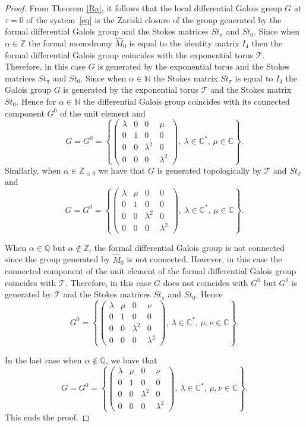 \documentclass[10pt,a4paper]{amsart}
\numberwithin{equation}{section}
\begin{document}
 \begin{proof}
 From Theorem \ref{Ra}, it follows that the local differential Galois group $G$ at $\tau=0$ of the system~\eqref{eq}
 is the Zariski closure of the group generated by the formal differential Galois group
 and the Stokes matrices $St_{\pi}$ and $St_0$. Since when $\alpha\in\mathbb{Z}$ the formal monodromy $\hat{M}_0$ is equal
 to the identity matrix $I_4$ then the formal differential Galois group coincides with the exponential torus $\mathcal{T}$.
 Therefore, in this case $G$ is generated by the exponential torus and the
 Stokes matrices $St_{\pi}$ and $St_0$. Since when $\alpha\in\mathbb{N}$ the Stokes matrix $St_{\pi}$ is equal to $I_4$ the
 Galois group $G$ is generated by the exponential torus $\mathcal{T}$ and the Stokes matrix $St_0$. Hence for $\alpha\in\mathbb{N}$
 the differential Galois group coincides with its connected component $G^0$ of the unit element and
 \[
 G=G^0=\left\{\begin{pmatrix}
 \lambda & 0 & 0 & \mu\\
 0 & 1 & 0 & 0\\
 0 & 0 & \lambda^2 & 0\\
 0 & 0 & 0 & \lambda^2
 \end{pmatrix}, \ \lambda\in\mathbb{C}^*,\, \mu\in\mathbb{C}\right\} .
 \]
Similarly, when $\alpha\in\mathbb{Z}_{\leq 0}$ we have that $G$
 is generated topologically by $\mathcal{T}$ and $St_{\pi}$ and
 \[
 G=G^0=\left\{\begin{pmatrix}
 \lambda & \mu & 0 & 0\\
 0 & 1 & 0 & 0\\
 0 & 0 & \lambda^2 & 0\\
 0 & 0 & 0 & \lambda^2
 \end{pmatrix}, \ \lambda\in\mathbb{C}^*,\, \mu\in\mathbb{C}\right\} .
 \]

 When $\alpha\in\mathbb{Q}$ but $\alpha\notin\mathbb{Z}$, the formal differential Galois group is not connected since the group generated
 by $\hat{M}_0$ is not connected. However, in this case the connected component of the unit element of the formal differential
 Galois group coincides with $\mathcal{T}$. Therefore, in this case $G$ does not coincides with $G^0$ but $G^0$ is generated by $\mathcal{T}$ and
 the Stokes matrices $St_{\pi}$ and $St_0$. Hence
 \[
 G^0=\left\{\begin{pmatrix}
 \lambda & \mu & 0 & \nu\\
 0 & 1 & 0 & 0\\
 0 & 0 & \lambda^2 & 0\\
 0 & 0 & 0 & \lambda^2
 \end{pmatrix}, \ \lambda\in\mathbb{C}^*,\, \mu, \nu\in\mathbb{C}\right\} .
 \]

 In the last case when $\alpha\notin\mathbb{Q}$, we have that
 \[
 G=G^0=\left\{\begin{pmatrix}
 \lambda & \mu & 0 & \nu\\
 0 & 1 & 0 & 0\\
 0 & 0 & \lambda^2 & 0\\
 0 & 0 & 0 & \lambda^2
 \end{pmatrix}, \ \lambda\in\mathbb{C}^*,\, \mu, \nu\in\mathbb{C}\right\} .
 \]
 This ends the proof.
 \end{proof}
\end{document}
